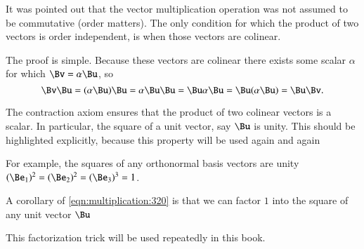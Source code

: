 %
%
It was pointed out that the vector multiplication operation was not assumed to be commutative (order matters).
The only condition for which the product of two vectors is order independent, is when those vectors are colinear.


The proof is simple.
Because these vectors are colinear there exists some scalar \( \alpha \) for which \( \Bv = \alpha \Bu \), so
\begin{dmath}\label{eqn:colinearVectors:380}
\Bv \Bu
=
(\alpha \Bu) \Bu
=
\alpha \Bu \Bu
=
\Bu \alpha \Bu
=
\Bu (\alpha \Bu)
=
\Bu \Bv.
\end{dmath}

The contraction axiom ensures that the product of two colinear vectors is a scalar.
In particular, the square of a unit vector, say \( \Bu \) is unity.
This should be highlighted explicitly, because this property will be used again and again

For example, the squares of any orthonormal basis vectors are unity \( (\Be_1)^2 = (\Be_2)^2 = (\Be_3)^3 = 1 \).

A corollary of
\cref{eqn:multiplication:320} is that we can factor \( 1 \) into
the square of any unit vector \( \Bu \)

This factorization trick will be used repeatedly in this book.
